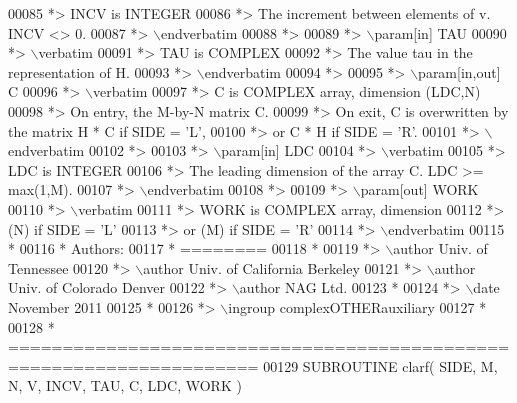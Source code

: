 \begin{DoxyCode}
00085 \textcolor{comment}{*>          INCV is INTEGER}
00086 \textcolor{comment}{*>          The increment between elements of v. INCV <> 0.}
00087 \textcolor{comment}{*> \(\backslash\)endverbatim}
00088 \textcolor{comment}{*>}
00089 \textcolor{comment}{*> \(\backslash\)param[in] TAU}
00090 \textcolor{comment}{*> \(\backslash\)verbatim}
00091 \textcolor{comment}{*>          TAU is COMPLEX}
00092 \textcolor{comment}{*>          The value tau in the representation of H.}
00093 \textcolor{comment}{*> \(\backslash\)endverbatim}
00094 \textcolor{comment}{*>}
00095 \textcolor{comment}{*> \(\backslash\)param[in,out] C}
00096 \textcolor{comment}{*> \(\backslash\)verbatim}
00097 \textcolor{comment}{*>          C is COMPLEX array, dimension (LDC,N)}
00098 \textcolor{comment}{*>          On entry, the M-by-N matrix C.}
00099 \textcolor{comment}{*>          On exit, C is overwritten by the matrix H * C if SIDE = 'L',}
00100 \textcolor{comment}{*>          or C * H if SIDE = 'R'.}
00101 \textcolor{comment}{*> \(\backslash\)endverbatim}
00102 \textcolor{comment}{*>}
00103 \textcolor{comment}{*> \(\backslash\)param[in] LDC}
00104 \textcolor{comment}{*> \(\backslash\)verbatim}
00105 \textcolor{comment}{*>          LDC is INTEGER}
00106 \textcolor{comment}{*>          The leading dimension of the array C. LDC >= max(1,M).}
00107 \textcolor{comment}{*> \(\backslash\)endverbatim}
00108 \textcolor{comment}{*>}
00109 \textcolor{comment}{*> \(\backslash\)param[out] WORK}
00110 \textcolor{comment}{*> \(\backslash\)verbatim}
00111 \textcolor{comment}{*>          WORK is COMPLEX array, dimension}
00112 \textcolor{comment}{*>                         (N) if SIDE = 'L'}
00113 \textcolor{comment}{*>                      or (M) if SIDE = 'R'}
00114 \textcolor{comment}{*> \(\backslash\)endverbatim}
00115 \textcolor{comment}{*}
00116 \textcolor{comment}{*  Authors:}
00117 \textcolor{comment}{*  ========}
00118 \textcolor{comment}{*}
00119 \textcolor{comment}{*> \(\backslash\)author Univ. of Tennessee }
00120 \textcolor{comment}{*> \(\backslash\)author Univ. of California Berkeley }
00121 \textcolor{comment}{*> \(\backslash\)author Univ. of Colorado Denver }
00122 \textcolor{comment}{*> \(\backslash\)author NAG Ltd. }
00123 \textcolor{comment}{*}
00124 \textcolor{comment}{*> \(\backslash\)date November 2011}
00125 \textcolor{comment}{*}
00126 \textcolor{comment}{*> \(\backslash\)ingroup complexOTHERauxiliary}
00127 \textcolor{comment}{*}
00128 \textcolor{comment}{*  =====================================================================}
00129 \textcolor{keyword}{      SUBROUTINE }clarf( SIDE, M, N, V, INCV, TAU, C, LDC, WORK )

\end{DoxyCode}
